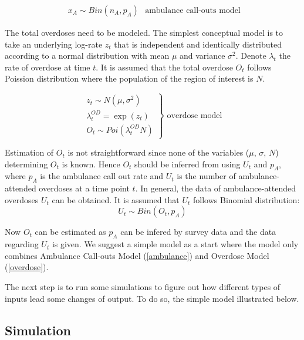 \documentclass[
10pt, %
a4paper, %
oneside, %
headinclude,footinclude, %
BCOR5mm, %
]{scrartcl}
\begin{document}
\begin{equation}
\label{ambulance}
	\left.\begin{aligned}
	x_{A} \sim Bin(n_{A},p_{A})
	\end{aligned}\right.
	\text{		ambulance call-outs model}
\end{equation}

The total overdoses need to be modeled. The simplest conceptual model is to take an underlying log-rate $z_t$ that is independent and identically distributed according to a normal distribution with mean $\mu$ and variance $\sigma^2$. \cite{Irvine:modelling} Denote $\lambda_{t}$ the rate of overdose at time $t$. It is assumed that the total overdose $O_t$ follows Poission distribution where the population of the region of interest is $N$. 

\begin{equation}
\label{overdose}
\left.\begin{aligned}
z_{t} \sim N(\mu, \sigma^{2}) \\
\lambda_{t}^{OD} = \exp(z_{t})\\
O_{t} \sim Poi(\lambda_{t}^{OD}N) 
\end{aligned}\right\} 
\text{		overdose model} 
\end{equation}



Estimation of $O_t$ is not straightforward since none of the variables ($\mu$, $\sigma$, $N$) determining $O_t$  is known. Hence $O_t$ should be inferred from using $U_t$ and \(p_A\), where $p_A$ is the ambulance call out rate and \(U_t\) is the number of  ambulance-attended overdoses at a time point $t$. In general, the data of ambulance-attended overdoses \(U_t\) can be obtained. It is assumed that  \(U_t\) follows Binomial distribution: 
\begin{equation}
\label{over_amb}
\left.
U_t \sim Bin(O_t, p_A)
\right.
\end{equation}

Now $O_t$ can be estimated as $p_A$ can be infered by survey data and the data regarding $U_t$ is given. We suggest a simple model as a start where the model only combines Ambulance Call-outs Model (\ref{ambulance}) and Overdose Model (\ref{overdose}). 

The next step is to run some simulations to figure out how different types of inputs lead some changes of output. To do so, the simple model illustrated below.\\

\subsection{Simulation}
\end{document}
